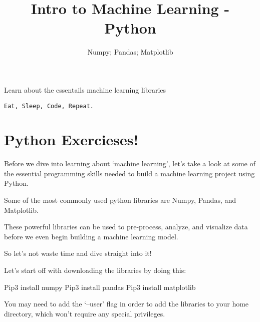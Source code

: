\documentclass{42-en}
\begin{document}
\title{Intro to Machine Learning - Python}
\subtitle{Numpy; Pandas; Matplotlib}


\summary
{
Learn about the essentails machine learning libraries
}

\maketitle

\tableofcontents


\newpage

\bigskip


\centerline{\texttt{Eat, Sleep, Code, Repeat.}}


\chapter{Python Exercieses!}


Before we dive into learning about ‘machine learning’, let’s take a look at some of the essential programming skills needed to build a machine learning project using Python. 

Some of the most commonly used python libraries are Numpy, Pandas, and Matplotlib. 

These powerful libraries can be used to pre-process, analyze, and visualize data before we even begin building a machine learning model. 

So let’s not waste time and dive straight into it!

Let’s start off with downloading the libraries by doing this:


\begin{42console}
Pip3 install numpy
Pip3 install pandas
Pip3 install matplotlib

You may need to add the ‘--user’ flag in order to add the libraries to your home directory, which won’t require any special privileges. 

\end{42console}
\end{document}
